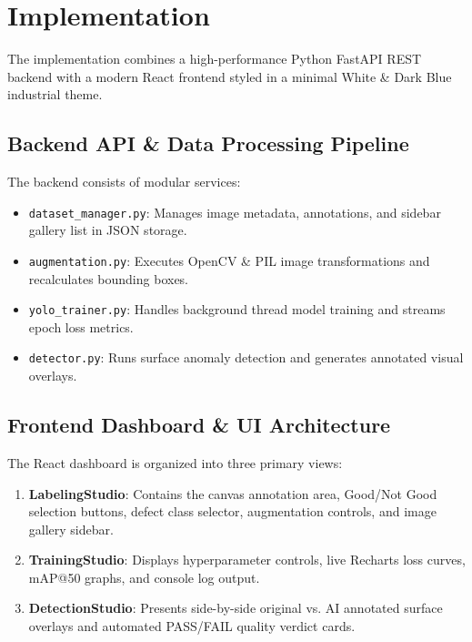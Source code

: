 \documentclass[conference]{IEEEtran}
\begin{document}
\section{Implementation}

The implementation combines a high-performance Python FastAPI REST backend with a modern React frontend styled in a minimal White & Dark Blue industrial theme.

\subsection{Backend API & Data Processing Pipeline}
The backend consists of modular services:
\begin{itemize}
    \item \texttt{dataset\_manager.py}: Manages image metadata, annotations, and sidebar gallery list in JSON storage.
    \item \texttt{augmentation.py}: Executes OpenCV & PIL image transformations and recalculates bounding boxes.
    \item \texttt{yolo\_trainer.py}: Handles background thread model training and streams epoch loss metrics.
    \item \texttt{detector.py}: Runs surface anomaly detection and generates annotated visual overlays.
\end{itemize}

\subsection{Frontend Dashboard & UI Architecture}
The React dashboard is organized into three primary views:
\begin{enumerate}
    \item \textbf{LabelingStudio}: Contains the canvas annotation area, Good/Not Good selection buttons, defect class selector, augmentation controls, and image gallery sidebar.
    \item \textbf{TrainingStudio}: Displays hyperparameter controls, live Recharts loss curves, mAP@50 graphs, and console log output.
    \item \textbf{DetectionStudio}: Presents side-by-side original vs. AI annotated surface overlays and automated PASS/FAIL quality verdict cards.
\end{enumerate}
\end{document}
